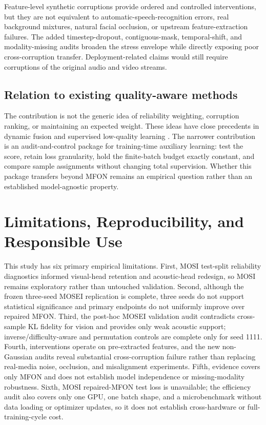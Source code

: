Feature-level synthetic corruptions provide ordered and controlled
interventions, but they are not equivalent to automatic-speech-recognition
errors, real background mixtures, natural facial occlusion, or upstream
feature-extraction failures. The added timestep-dropout, contiguous-mask,
temporal-shift, and modality-missing audits broaden the stress envelope while
directly exposing poor cross-corruption transfer. Deployment-related claims
would still require corruptions of the original audio and video streams.

\subsection{Relation to existing quality-aware
methods}\label{relation-to-existing-quality-aware-methods}

The contribution is not the generic idea of reliability weighting,
corruption ranking, or maintaining an expected weight. These ideas have
close precedents in dynamic fusion and supervised low-quality learning
\cite{zhang2023qmf, mai2025samlml}. The narrower contribution is an
audit-and-control package for training-time auxiliary learning: test the
score, retain loss granularity, hold the finite-batch budget exactly
constant, and compare sample assignments without changing total
supervision. Whether this package transfers beyond MFON remains an
empirical question rather than an established model-agnostic property.

\section{Limitations, Reproducibility, and Responsible
Use}\label{limitations-reproducibility-and-responsible-use}

This study has six primary empirical limitations. First, MOSI test-split
reliability diagnostics informed visual-head retention and acoustic-head
redesign, so MOSI remains exploratory rather than untouched validation.
Second, although the frozen three-seed MOSEI replication is complete, three
seeds do not support statistical significance and primary endpoints do not
uniformly improve over repaired MFON. Third, the post-hoc MOSEI validation
audit contradicts cross-sample KL fidelity for vision and provides only weak
acoustic support; inverse/difficulty-aware and permutation controls are
complete only for seed 1111. Fourth, interventions operate on pre-extracted
features, and the new non-Gaussian audits reveal substantial cross-corruption
failure rather than replacing real-media noise, occlusion, and misalignment
experiments. Fifth, evidence covers only MFON and does not establish model
independence or missing-modality robustness. Sixth, MOSI repaired-MFON test
loss is unavailable; the efficiency audit also covers only one GPU, one batch
shape, and a microbenchmark without data loading or optimizer updates, so it
does not establish cross-hardware or full-training-cycle cost.

